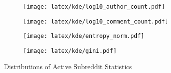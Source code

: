 \begin{figure}
     \centering
     \begin{subfigure}[b]{0.49\textwidth}
         \centering
         \texttt{[image: latex/kde/log10\_author\_count.pdf]}
         \label{hist:author}
     \end{subfigure}
     \hfill
     \begin{subfigure}[b]{0.49\textwidth}
         \centering
         \texttt{[image: latex/kde/log10\_comment\_count.pdf]}
         \label{hist:comment}
     \end{subfigure}
     \hfill
     \begin{subfigure}[b]{0.49\textwidth}
         \centering
         \texttt{[image: latex/kde/entropy\_norm.pdf]}
         \label{hist:entropy}
     \end{subfigure}
     \hfill
     \begin{subfigure}[b]{0.49\textwidth}
         \centering
         \texttt{[image: latex/kde/gini.pdf]}
         \label{hist:gini}
     \end{subfigure}
        \caption{Distributions of Active Subreddit Statistics}
        \label{hists}
\end{figure}
